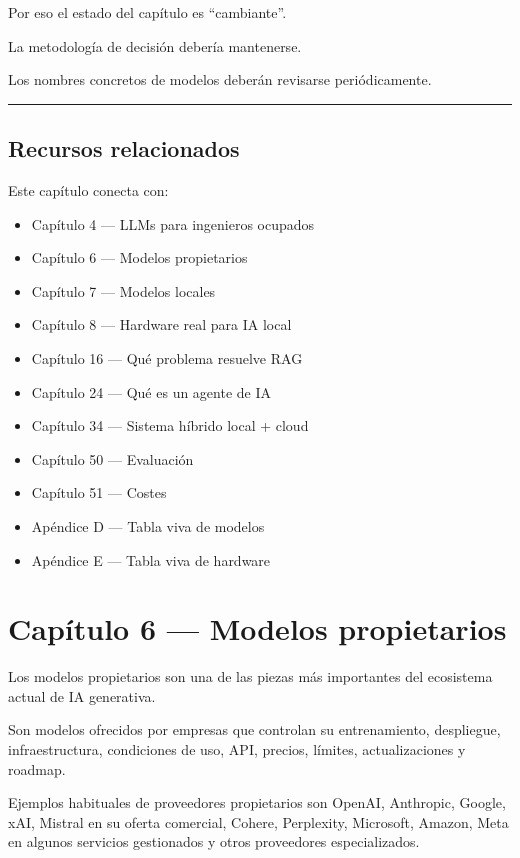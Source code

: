 Por eso el estado del capítulo es ``cambiante''.

La metodología de decisión debería mantenerse.

Los nombres concretos de modelos deberán revisarse periódicamente.

\begin{center}\rule{0.5\linewidth}{0.5pt}\end{center}

\section{Recursos relacionados}\label{recursos-relacionados-4}

Este capítulo conecta con:

\begin{itemize}
\tightlist
\item
  Capítulo 4 --- LLMs para ingenieros ocupados
\item
  Capítulo 6 --- Modelos propietarios
\item
  Capítulo 7 --- Modelos locales
\item
  Capítulo 8 --- Hardware real para IA local
\item
  Capítulo 16 --- Qué problema resuelve RAG
\item
  Capítulo 24 --- Qué es un agente de IA
\item
  Capítulo 34 --- Sistema híbrido local + cloud
\item
  Capítulo 50 --- Evaluación
\item
  Capítulo 51 --- Costes
\item
  Apéndice D --- Tabla viva de modelos
\item
  Apéndice E --- Tabla viva de hardware
\end{itemize}

\newpage

\chapter{Capítulo 6 --- Modelos
propietarios}\label{capuxedtulo-6-modelos-propietarios}

Los modelos propietarios son una de las piezas más importantes del
ecosistema actual de IA generativa.

Son modelos ofrecidos por empresas que controlan su entrenamiento,
despliegue, infraestructura, condiciones de uso, API, precios, límites,
actualizaciones y roadmap.

Ejemplos habituales de proveedores propietarios son OpenAI, Anthropic,
Google, xAI, Mistral en su oferta comercial, Cohere, Perplexity,
Microsoft, Amazon, Meta en algunos servicios gestionados y otros
proveedores especializados.

